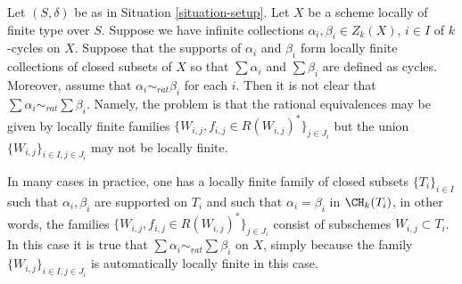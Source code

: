 \begin{remark}
\label{remark-infinite-sums-rational-equivalences}
Let $(S, \delta)$ be as in Situation \ref{situation-setup}.
Let $X$ be a scheme locally of finite type over $S$.
Suppose we have infinite collections $\alpha_i, \beta_i \in Z_k(X)$,
$i \in I$ of $k$-cycles on $X$. Suppose that the supports
of $\alpha_i$ and $\beta_i$ form locally finite collections
of closed subsets of $X$ so that $\sum \alpha_i$
and $\sum \beta_i$ are defined as cycles. Moreover, assume that
$\alpha_i \sim_{rat} \beta_i$ for each $i$. Then it is not
clear that $\sum \alpha_i \sim_{rat} \sum \beta_i$. Namely,
the problem is that the rational equivalences may be
given by locally finite
families $\{W_{i, j}, f_{i, j} \in R(W_{i, j})^*\}_{j \in J_i}$
but the union $\{W_{i, j}\}_{i \in I, j\in J_i}$ may not
be locally finite.

\medskip\noindent
In many cases in practice, one has a locally finite family of closed
subsets $\{T_i\}_{i \in I}$ such that $\alpha_i, \beta_i$
are supported on $T_i$ and such that $\alpha_i = \beta_i$
in $\CH_k(T_i)$, in other words, the families
$\{W_{i, j}, f_{i, j} \in R(W_{i, j})^*\}_{j \in J_i}$
consist of subschemes $W_{i, j} \subset T_i$. In this case it is true that
$\sum \alpha_i \sim_{rat} \sum \beta_i$ on $X$, simply because
the family $\{W_{i, j}\}_{i \in I, j\in J_i}$ is automatically
locally finite in this case.
\end{remark}






